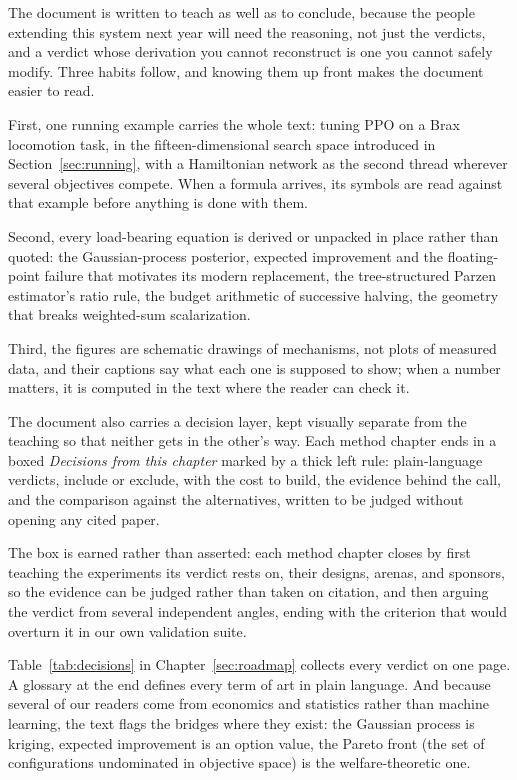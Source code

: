 The document is written to teach as well as to conclude, because the
people extending this system next year will need the reasoning, not just
the verdicts, and a verdict whose derivation you cannot reconstruct is
one you cannot safely modify. Three habits follow, and knowing them up
front makes the document easier to read.

First, one running example
carries the whole text: tuning PPO on a Brax locomotion task, in the
fifteen-dimensional search space introduced in
Section~\ref{sec:running}, with a Hamiltonian network as the second
thread wherever several objectives compete. When a formula arrives, its
symbols are read against that example before anything is done with
them.

Second, every load-bearing equation is derived or unpacked in
place rather than quoted: the Gaussian-process posterior, expected
improvement and the floating-point failure that motivates its modern
replacement, the tree-structured Parzen estimator's ratio rule, the
budget arithmetic of successive halving, the geometry that breaks
weighted-sum scalarization.

Third, the figures are schematic drawings
of mechanisms, not plots of measured data, and their captions say what
each one is supposed to show; when a number matters, it is computed in
the text where the reader can check it.

The document also carries a decision layer, kept visually separate from
the teaching so that neither gets in the other's way. Each method
chapter ends in a boxed \emph{Decisions from this chapter} marked by a
thick left rule: plain-language verdicts, include or exclude, with the
cost to build, the evidence behind the call, and the comparison against
the alternatives, written to be judged without opening any cited paper.

The box is earned rather than asserted: each method chapter closes by
first teaching the experiments its verdict rests on, their designs,
arenas, and sponsors, so the evidence can be judged rather than taken
on citation, and then arguing the verdict from several independent
angles, ending with the criterion that would overturn it in our own
validation suite.

Table~\ref{tab:decisions} in Chapter~\ref{sec:roadmap} collects every
verdict on one page. A glossary at the end defines every term of art in
plain language. And because several of our readers come from economics
and statistics rather than machine learning, the text flags the bridges
where they exist: the Gaussian process is kriging, expected improvement
is an option value, the Pareto front (the set of configurations
undominated in objective space) is the welfare-theoretic one.

